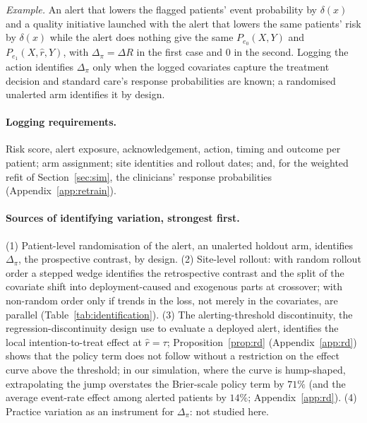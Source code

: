 \documentclass[letterpaper]{article} %
\newcommand{\rhat}{\hat r}
\begin{document}
\noindent\emph{Example.} An alert that lowers the flagged patients' event
probability by $\delta(x)$ and a quality initiative launched with the alert
that lowers the same patients' risk by $\delta(x)$ while the alert does
nothing give the same $P_{e_0}(X, Y)$ and $P_{e_1}(X, \rhat, Y)$, with
$\Delta_\pi = \Delta R$ in the first case and $0$ in the second. Logging the
action identifies $\Delta_\pi$ only when the logged covariates capture the
treatment decision and standard care's response probabilities are known; a
randomised unalerted arm identifies it by design.

\paragraph{Logging requirements.} Risk score, alert exposure, acknowledgement,
action, timing and outcome per patient; arm assignment; site identities and
rollout dates; and, for the weighted refit of Section~\ref{sec:sim}, the
clinicians' response probabilities (Appendix~\ref{app:retrain}).

\paragraph{Sources of identifying variation, strongest first.}
(1) Patient-level randomisation of the alert, an unalerted holdout arm,
identifies $\Delta_\pi$, the prospective contrast, by design.
(2) Site-level rollout: with random rollout order a stepped wedge identifies
the retrospective contrast and the split of the covariate shift into
deployment-caused and exogenous parts at crossover; with non-random order only
if trends in the loss, not merely in the covariates, are parallel
(Table~\ref{tab:identification}).
(3) The alerting-threshold discontinuity, the regression-discontinuity design
\citet{gallo2024effectiveness} use to evaluate a deployed alert, identifies
the local intention-to-treat effect at $\rhat = \tau$; Proposition~\ref{prop:rd}
(Appendix~\ref{app:rd}) shows that the policy term does not follow without a
restriction on the effect curve above the threshold; in our simulation,
where the curve is hump-shaped, extrapolating the jump overstates the
Brier-scale policy term by $71\%$ (and the average event-rate effect among
alerted patients by $14\%$; Appendix~\ref{app:rd}).
(4) Practice variation as an instrument for $\Delta_\pi$: not studied here.
\end{document}
